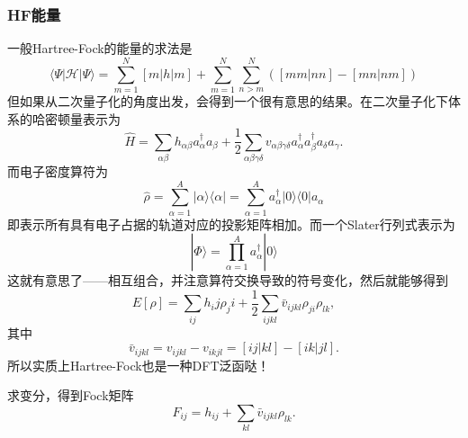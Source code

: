 \documentclass[12pt,a4paper,openany,twoside]{article}
\numberwithin{equation}{section}
\begin{document}
                \subsubsection{HF能量}
                一般Hartree-Fock的能量的求法是
                \begin{equation}
                    \langle \Psi|\mathscr{H}|\Psi\rangle =\sum_{m=1}^N [m|h|m] + \sum_{m=1}^N\sum_{n>m}^N \left([mm|nn] - [mn|nm]\right)
                \end{equation}
                但如果从二次量子化的角度出发，会得到一个很有意思的结果\cite{helgaker2014molecular}。在二次量子化下体系的哈密顿量表示为
                \begin{equation}
                    \hat{H} = \sum_{\alpha \beta} h_{\alpha \beta} a_\alpha^\dagger a_\beta + \frac{1}{2} \sum_{\alpha \beta \gamma \delta} v_{\alpha \beta \gamma \delta} a_\alpha ^\dagger a_\beta ^\dagger a_\delta a_\gamma.
                \end{equation}
                而电子密度算符为
                \begin{equation}
                    \hat{\rho} = \sum_{\alpha = 1} ^{A} |\alpha \rangle \langle \alpha | = \sum_{\alpha = 1} ^{A} a_\alpha^\dagger |0\rangle\langle 0| a_\alpha
                \end{equation}
                即表示所有具有电子占据的轨道对应的投影矩阵相加。而一个Slater行列式表示为
                \begin{equation}
                    |\Phi\rangle = \prod_{\alpha = 1}^A a_\alpha^\dagger |0\rangle
                \end{equation}
                这就有意思了——相互组合，并注意算符交换导致的符号变化，然后就能够得到
                \begin{equation}
                    E[\rho] = \sum_{ij} h_ij \rho_ji + \frac{1}{2} \sum_{ijkl} \bar{v}_{ijkl} \rho_{ji} \rho_{lk},
                \end{equation}
                其中
                \begin{equation}
                    \bar{v}_{ijkl} = v_{ijkl} - v_{ikjl} = [ij|kl] - [ik|jl].
                \end{equation}
                所以实质上Hartree-Fock也是一种DFT泛函哒！

                求变分，得到Fock矩阵
                \begin{equation}
                    F_{ij} = h_{ij} + \sum_{kl} \bar{v}_{ijkl} \rho_{lk}.
                \end{equation}
\end{document}
